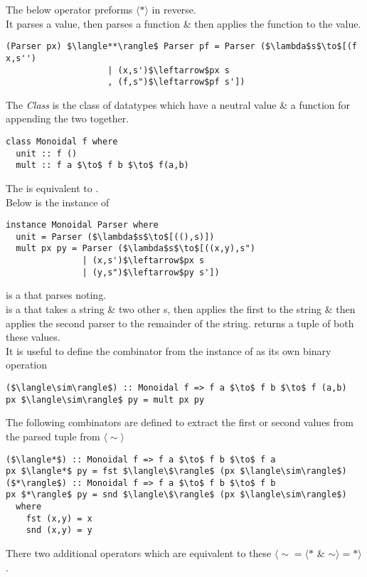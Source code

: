 \documentclass[11pt,a4paper]{article}
\begin{document}
The below operator preforms $\langle*\rangle$ in reverse.\\
It parses a value, then parses a function \& then applies the function to the value.
\begin{lstlisting}
(Parser px) $\langle**\rangle$ Parser pf = Parser ($\lambda$s$\to$[(f x,s'')
					| (x,s')$\leftarrow$px s
					, (f,s")$\leftarrow$pf s'])
\end{lstlisting}

The {} \textit{Class} is the class of datatypes which have a neutral value \& a function for appending the two together.
\begin{lstlisting}
class Monoidal f where
  unit :: f ()
  mult :: f a $\to$ f b $\to$ f(a,b)
\end{lstlisting}
\NB The {} is equivalent to {}.\\

Below is the {} instance of {}
\begin{lstlisting}
instance Monoidal Parser where
  unit = Parser ($\lambda$s$\to$[((),s)])
  mult px py = Parser ($\lambda$s$\to$[((x,y),s")
	  		   | (x,s')$\leftarrow$px s
  			   | (y,s")$\leftarrow$py s'])
\end{lstlisting}
{} is a {} that parses noting.\\
{} is a {} that takes a string \& two other {}s, then applies the first {} to the string \& then applies the second parser to the remainder of the string. {} returns a tuple of both these values.\\

It is useful to define the {} combinator from the {} instance of {} as its own binary operation
\begin{lstlisting}
($\langle\sim\rangle$) :: Monoidal f => f a $\to$ f b $\to$ f (a,b)
px $\langle\sim\rangle$ py = mult px py
\end{lstlisting}

The following combinators are defined to extract the first or second values from the parsed tuple from $\langle\sim\rangle$
\begin{lstlisting}
($\langle*$) :: Monoidal f => f a $\to$ f b $\to$ f a
px $\langle*$ py = fst $\langle\$\rangle$ (px $\langle\sim\rangle$)
($*\rangle$) :: Monoidal f => f a $\to$ f b $\to$ f b
px $*\rangle$ py = snd $\langle\$\rangle$ (px $\langle\sim\rangle$)
  where
    fst (x,y) = x
    snd (x,y) = y
\end{lstlisting}
\NB There two additional operators which are equivalent to these $\langle\sim=\langle*$ \& $\sim\rangle=*\rangle$.\\
\end{document}
